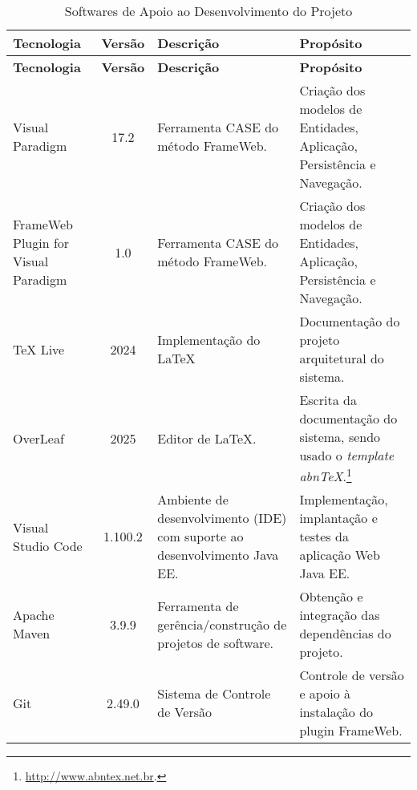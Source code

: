\begin{footnotesize}
\begin{longtable}{|p{2.5cm}|c|p{5cm}|p{5.5cm}|}
	\caption{Softwares de Apoio ao Desenvolvimento do Projeto}	
	\label{tabela-software}\\\hline
	
	\rowcolor{lightgray}
	\textbf{Tecnologia} & \textbf{Versão} & \textbf{Descrição} & \textbf{Propósito} \\\hline 
	\endfirsthead
	\hline
	\rowcolor{lightgray}
	\textbf{Tecnologia} & \textbf{Versão} & \textbf{Descrição} & \textbf{Propósito} \\\hline 
	\endhead

    Visual Paradigm & 17.2 & Ferramenta CASE do método FrameWeb. & Criação dos modelos de Entidades, Aplicação, Persistência e Navegação. \\\hline
	
    FrameWeb Plugin for Visual Paradigm & 1.0 & Ferramenta CASE do método FrameWeb. & Criação dos modelos de Entidades, Aplicação, Persistência e Navegação. \\\hline

	TeX Live & 2024 & Implementação do \LaTeX & Documentação do projeto arquitetural do sistema. \\\hline       
	
	OverLeaf & 2025 & Editor de LaTeX. &  Escrita da documentação do sistema, sendo usado o \textit{template} \textit{abnTeX}.\footnote{\url{http://www.abntex.net.br}.} \\\hline    

	Visual Studio Code & 1.100.2 & Ambiente de desenvolvimento (IDE) com suporte ao desenvolvimento Java EE. & Implementação, implantação e testes da aplicação Web Java EE. \\\hline 
	
	Apache Maven & 3.9.9 & Ferramenta de gerência/construção de projetos de software. & Obtenção e integração das dependências do projeto. \\\hline

    Git & 2.49.0 & Sistema de Controle de Versão & Controle de versão e apoio à instalação do plugin FrameWeb.\\\hline
\end{longtable}
\end{footnotesize}
